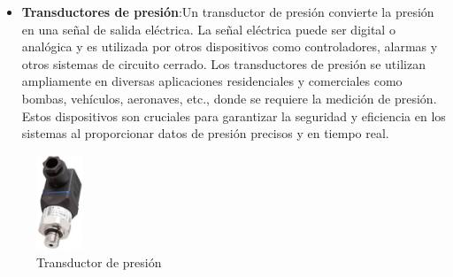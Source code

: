 \documentclass{article}
\begin{document}
\begin{itemize}
		\item \textbf{Transductores de presión}:Un transductor de presión convierte la presión en una señal de salida eléctrica. La señal eléctrica puede ser digital o analógica y es utilizada por otros dispositivos como controladores, alarmas y otros sistemas de circuito cerrado. Los transductores de presión se utilizan ampliamente en diversas aplicaciones residenciales y comerciales como bombas, vehículos, aeronaves, etc., donde se requiere la medición de presión. Estos dispositivos son cruciales para garantizar la seguridad y eficiencia en los sistemas al proporcionar datos de presión precisos y en tiempo real.
	\end{itemize}
		\begin{figure}[H]
		\centering
		\includegraphics[width=0.125\textwidth]{pressure-transducer.png}
		\caption{Transductor de presión}
	\end{figure}
	
\end{document}
